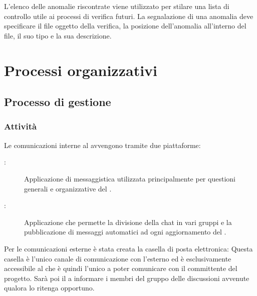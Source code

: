 \documentclass[a4paper, titlepage]{article}
\begin{document}
L'elenco delle anomalie riscontrate viene utilizzato per stilare una lista di controllo utile ai processi di verifica futuri. La segnalazione di una anomalia deve specificare il file oggetto della verifica, la posizione dell'anomalia all'interno del file, il suo tipo e la sua descrizione.


\newpage

\section{Processi organizzativi}

\subsection{Processo di gestione}

\subsubsection{Attività}


Le comunicazioni interne al  avvengono tramite due piattaforme:
\begin{description}
	\item[:] Applicazione di messaggistica utilizzata principalmente per questioni generali e organizzative del .
	\item[:] Applicazione che permette la divisione della chat in vari gruppi e la pubblicazione di messaggi automatici ad ogni aggiornamento del .
\end{description}

Per le comunicazioni esterne è stata creata la casella di posta elettronica:  Questa casella è l'unico canale di comunicazione con l'esterno ed è esclusivamente accessibile al  che è quindi l'unico a poter comunicare con il committente del progetto. Sarà poi il  a informare i membri del gruppo delle discussioni avvenute qualora lo ritenga opportuno.
\end{document}
